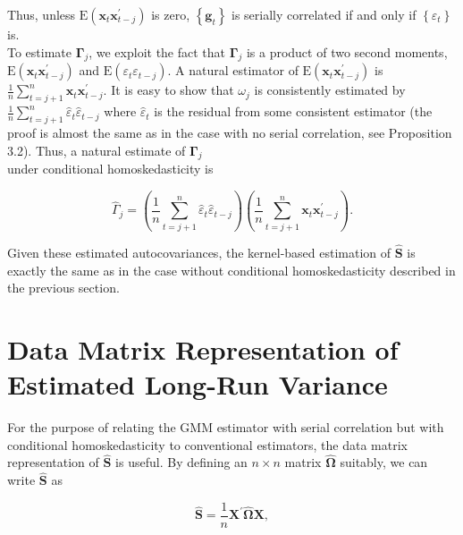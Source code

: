 \documentclass[10pt]{article}
\begin{document}
Thus, unless $\mathrm{E}\left(\mathbf{x}_{t} \mathbf{x}_{t-j}^{\prime}\right)$ is zero, $\left\{\mathbf{g}_{t}\right\}$ is serially correlated if and only if $\left\{\varepsilon_{t}\right\}$ is.\\
To estimate $\boldsymbol{\Gamma}_{j}$, we exploit the fact that $\boldsymbol{\Gamma}_{j}$ is a product of two second moments, $\mathrm{E}\left(\mathbf{x}_{t} \mathbf{x}_{t-j}^{\prime}\right)$ and $\mathrm{E}\left(\varepsilon_{t} \varepsilon_{t-j}\right)$. A natural estimator of $\mathrm{E}\left(\mathbf{x}_{t} \mathbf{x}_{t-j}^{\prime}\right)$ is $\frac{1}{n} \sum_{t=j+1}^{n} \mathbf{x}_{t} \mathbf{x}_{t-j}^{\prime}$. It is easy to show that $\omega_{j}$ is consistently estimated by $\frac{1}{n} \sum_{t=j+1}^{n} \hat{\varepsilon}_{t} \hat{\varepsilon}_{t-j}$ where $\hat{\varepsilon}_{t}$ is the residual from some consistent estimator (the proof is almost the same as in the case with no serial correlation, see Proposition 3.2). Thus, a natural estimate of $\boldsymbol{\Gamma}_{j}$\\
under conditional homoskedasticity is


\begin{equation*}
\widehat{\Gamma}_{j}=\left(\frac{1}{n} \sum_{t=j+1}^{n} \hat{\varepsilon}_{t} \hat{\varepsilon}_{t-j}\right)\left(\frac{1}{n} \sum_{t=j+1}^{n} \mathbf{x}_{t} \mathbf{x}_{t-j}^{\prime}\right) . \tag{6.7.4}
\end{equation*}


Given these estimated autocovariances, the kernel-based estimation of $\widehat{\mathbf{S}}$ is exactly the same as in the case without conditional homoskedasticity described in the previous section.

\section*{Data Matrix Representation of Estimated Long-Run Variance}
For the purpose of relating the GMM estimator with serial correlation but with conditional homoskedasticity to conventional estimators, the data matrix representation of $\widehat{\mathbf{S}}$ is useful. By defining an $n \times n$ matrix $\widehat{\boldsymbol{\Omega}}$ suitably, we can write $\widehat{\mathbf{S}}$ as


\begin{equation*}
\widehat{\mathbf{S}}=\frac{1}{n} \mathbf{X}^{\prime} \widehat{\mathbf{\Omega}} \mathbf{X}, \tag{6.7.5}
\end{equation*}
\end{document}
